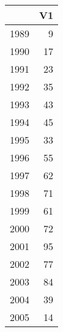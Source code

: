 \begin{table}[ht]
\centering
\begin{tabular}{rr}
  \hline
 & V1 \\ 
  \hline
1989 &   9 \\ 
  1990 &  17 \\ 
  1991 &  23 \\ 
  1992 &  35 \\ 
  1993 &  43 \\ 
  1994 &  45 \\ 
  1995 &  33 \\ 
  1996 &  55 \\ 
  1997 &  62 \\ 
  1998 &  71 \\ 
  1999 &  61 \\ 
  2000 &  72 \\ 
  2001 &  95 \\ 
  2002 &  77 \\ 
  2003 &  84 \\ 
  2004 &  39 \\ 
  2005 &  14 \\ 
   \hline
\end{tabular}
\end{table}
